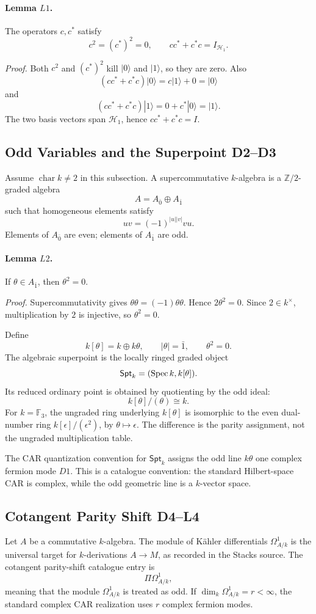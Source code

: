 \paragraph{Lemma \(L1\).}
The operators \(c,c^*\) satisfy
\[
  c^2=(c^*)^2=0,\qquad cc^*+c^*c=I_{\mathcal H_1}.
\]

\emph{Proof.}
Both \(c^2\) and \((c^*)^2\) kill \(|0\rangle\) and \(|1\rangle\), so they are
zero.  Also
\[
  (cc^*+c^*c)|0\rangle=c|1\rangle+0=|0\rangle
\]
and
\[
  (cc^*+c^*c)|1\rangle=0+c^*|0\rangle=|1\rangle .
\]
The two basis vectors span \(\mathcal H_1\), hence \(cc^*+c^*c=I\).

\subsection{Odd Variables and the Superpoint D2--D3}
Assume \(\operatorname{char}k\ne2\) in this subsection.  A
supercommutative \(k\)-algebra is a \(\mathbb Z/2\)-graded algebra
\[
  A=A_{\bar0}\oplus A_{\bar1}
\]
such that homogeneous elements satisfy
\[
  uv=(-1)^{|u||v|}vu .
\]
Elements of \(A_{\bar0}\) are even; elements of \(A_{\bar1}\) are odd.

\paragraph{Lemma \(L2\).}
If \(\theta\in A_{\bar1}\), then \(\theta^2=0\).

\emph{Proof.}
Supercommutativity gives \(\theta\theta=(-1)\theta\theta\).  Hence
\(2\theta^2=0\).  Since \(2\in k^\times\), multiplication by \(2\) is
injective, so \(\theta^2=0\).

Define
\[
  k[\theta]=k\oplus k\theta,\qquad |\theta|=\bar1,\qquad \theta^2=0 .
\]
The algebraic superpoint is the locally ringed graded object
\[
  \mathsf{Spt}_k=(\operatorname{Spec} k,k[\theta]).
\]
Its reduced ordinary point is obtained by quotienting by the odd ideal:
\[
  k[\theta]/(\theta)\cong k .
\]
For \(k=\mathbb F_3\), the ungraded ring underlying \(k[\theta]\) is
isomorphic to the even dual-number ring \(k[\epsilon]/(\epsilon^2)\), by
\(\theta\mapsto\epsilon\).  The difference is the parity assignment, not the
ungraded multiplication table.

The CAR quantization convention for \(\mathsf{Spt}_k\) assigns the odd line
\(k\theta\) one complex fermion mode \(D1\).  This is a catalogue convention:
the standard Hilbert-space CAR is complex, while the odd geometric line is a
\(k\)-vector space.

\subsection{Cotangent Parity Shift D4--L4}
Let \(A\) be a commutative \(k\)-algebra.  The module of K\"ahler differentials
\(\Omega^1_{A/k}\) is the universal target for \(k\)-derivations
\(A\to M\), as recorded in the Stacks source.  The cotangent parity-shift
catalogue entry is
\[
  \Pi\Omega^1_{A/k},
\]
meaning that the module \(\Omega^1_{A/k}\) is treated as odd.  If
\(\dim_k\Omega^1_{A/k}=r<\infty\), the standard complex CAR realization uses
\(r\) complex fermion modes.

